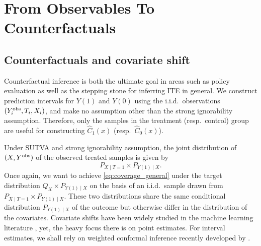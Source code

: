 
\section{From Observables To Counterfactuals}\label{sec:counterfactual}

\subsection{Counterfactuals and covariate shift}\label{subsec:counterfactuals_covariate_shift}
Counterfactual inference is both the ultimate goal in areas such as
policy evaluation \citep[e.g.][]{athey2018matrix, ben2018augmented,
  arkhangelsky2019synthetic} as well as the stepping stone for
inferring ITE in general. We construct prediction intervals for $Y(1)$
and $Y(0)$ using the i.i.d.~observations
$(Y_{i}^{\mathrm{obs}}, T_{i}, X_{i})$, and make no assumption other than the
strong ignorability assumption. Therefore, only the samples in the
treatment (resp.~control) group are useful for constructing
$\hat{C}_{1}(x)$ (resp.~$\hat{C}_{0}(x)$).

Under SUTVA and strong ignorability assumption, the joint distribution of
$(X, Y^{\mathrm{obs}})$ of the observed treated samples is given by 
\[
P_{X\mid T = 1} \times P_{Y(1) \mid X}.
\]
Once again, we want to achieve \eqref{eq:coverage_general} under the
target distribution $Q_{X}\times P_{Y(1)\mid X}$ on the basis of an
i.i.d.~sample drawn from $P_{X\mid T = 1}\times P_{Y(1) \mid X}$.
These two distributions share the same conditional distribution
$P_{Y(1)\mid X}$ of the outcome but otherwise differ in the
distribution of the covariates. Covariate shifts have been widely
studied in the machine learning literature
\citep[e.g.][]{shimodaira2000improving}, yet, the heavy focus there is
on point estimates. For interval estimates, we shall rely on weighted
conformal inference recently developed by \cite{barber2019conformal}.


